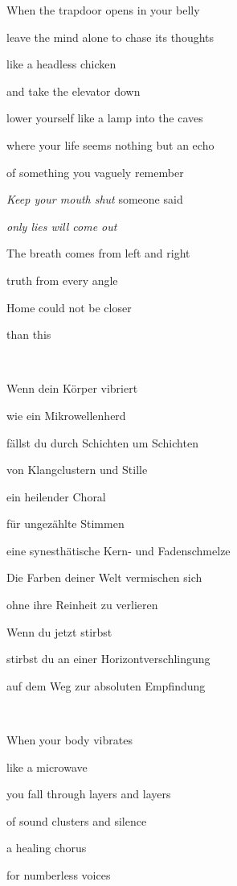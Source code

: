 When the trapdoor opens in your belly

leave the mind alone to chase its thoughts

like a headless chicken

and take the elevator down

lower yourself like a lamp into the caves

where your life seems nothing but an echo

of something you vaguely remember


\bigskip

\emph{Keep your mouth shut }someone said 

\emph{
only lies will come out}


\bigskip

The breath comes from left and right

truth from every angle

Home could not be closer 

than this


\bigskip


~

Wenn dein Körper vibriert

wie ein Mikrowellenherd

fällst du durch Schichten um Schichten

von Klangclustern und Stille

ein heilender Choral

für ungezählte Stimmen

eine synesthätische Kern- und Fadenschmelze

Die Farben deiner Welt vermischen sich

ohne ihre Reinheit zu verlieren

Wenn du jetzt stirbst

stirbst du an einer Horizontverschlingung

auf dem Weg zur absoluten Empfindung

~



\bigskip

When your body vibrates

like a microwave

you fall through layers and layers

of sound clusters and silence

a healing chorus

for numberless voices

